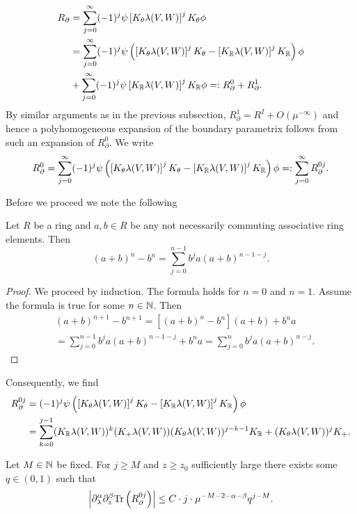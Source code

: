 \begin{align*}
R_\partial 
&= \sum_{j=0}^\infty (-1)^j \psi \left[K_\theta \lambda(V,W)\right]^j 
K_\theta \phi \\
&= \sum_{j=0}^\infty (-1)^j \psi \left( \left[K_\theta \lambda(V,W)\right]^j 
K_\theta -  \left[K_{\mathbb{R}} \lambda(V,W)\right]^j K_{\mathbb{R}} \right) \phi \\
&+  \sum_{j=0}^\infty (-1)^j \psi \left[K_{\mathbb{R}} \lambda(V,W)\right]^j 
K_{\mathbb{R}} \phi =: R^0_\partial + R^1_\partial.
\end{align*}
By similar arguments as in the previous subsection, $R^1_\partial=R^I + O(\mu^{-\infty})$ 
and hence a polyhomogeneous expansion of the boundary parametrix follows 
from such an expansion of $R^0_\partial$. We write
\begin{align*}
R^0_\partial = \sum_{j=0}^{\infty} (-1)^j \psi \left( \left[K_\theta \lambda(V,W)\right]^j 
K_\theta -  \left[K_{\mathbb{R}} \lambda(V,W)\right]^j K_{\mathbb{R}} \right) \phi 
=: \sum_{j=0}^{\infty} R^{0j}_\partial.
\end{align*}

Before we proceed we note the following 
\begin{prop}
Let $R$ be a ring and $a,b\in R$ be any not necessarily commuting associative ring elements. Then
$$(a+b)^n-b^n= \sum_{j=0}^{n-1} b^j a (a+b)^{n-1-j}.$$
\end{prop}
\begin{proof}
We proceed by induction. The formula holds for $n=0$ and $n=1$. 
Assume the formula is true for some $n\in \mathbb{N}$. Then
\begin{align*}
&(a+b)^{n+1} -b^{n+1} = [(a+b)^n-b^n](a+b) + b^n a \\
&= \sum_{j=0}^{n-1} b^j a (a+b)^{n-1-j} + b^na = \sum_{j=0}^{n} b^j a (a+b)^{n-j}.
\end{align*}
\end{proof}

Consequently, we find
\begin{align*}
R^{0j}_\partial &= (-1)^j\psi \left( \left[K_\theta \lambda(V,W)\right]^j 
K_\theta -  \left[K_{\mathbb{R}} \lambda(V,W)\right]^j K_{\mathbb{R}} \right) \phi \\
&= \sum_{k=0}^{j-1} (K_{\mathbb{R}} \lambda(V,W))^k (K_+ \lambda(V,W)) (K_\theta \lambda(V,W))^{j-k-1} K_{\mathbb{R}} 
+  (K_\theta \lambda(V,W))^{j} K_+.
\end{align*}

\begin{prop}\label{R-expansion}
Let $M\in \mathbb{N}$ be fixed. For $j\geq M$ and $z\geq z_0$ sufficiently large there exists some $q \in (0,1)$ such that 
\begin{equation}
\left|\partial^{\mathrm{\alpha}}_\lambda \partial_z^\beta \textup{Tr} \left( R^{0j}_\partial \right) \right| 
\leq C \cdot j \cdot \mu^{-M-2-\mathrm{\alpha}-\beta} q^{j-M}.
\end{equation}
\end{prop}

